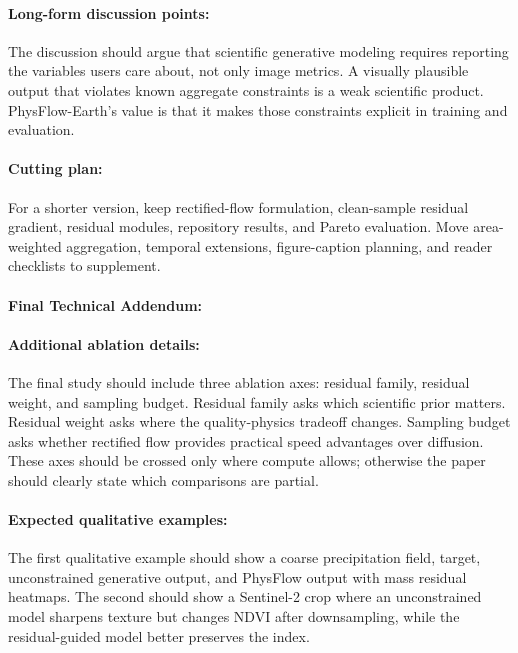 \documentclass{article}
\begin{document}
\paragraph{Long-form discussion points:}

The discussion should argue that scientific generative modeling requires reporting the variables users care about, not only image metrics. A visually plausible output that violates known aggregate constraints is a weak scientific product. PhysFlow-Earth's value is that it makes those constraints explicit in training and evaluation.

\paragraph{Cutting plan:}

For a shorter version, keep rectified-flow formulation, clean-sample residual gradient, residual modules, repository results, and Pareto evaluation. Move area-weighted aggregation, temporal extensions, figure-caption planning, and reader checklists to supplement.

\paragraph{Final Technical Addendum:}

\paragraph{Additional ablation details:}

The final study should include three ablation axes: residual family, residual weight, and sampling budget. Residual family asks which scientific prior matters. Residual weight asks where the quality-physics tradeoff changes. Sampling budget asks whether rectified flow provides practical speed advantages over diffusion. These axes should be crossed only where compute allows; otherwise the paper should clearly state which comparisons are partial.

\paragraph{Expected qualitative examples:}

The first qualitative example should show a coarse precipitation field, target, unconstrained generative output, and PhysFlow output with mass residual heatmaps. The second should show a Sentinel-2 crop where an unconstrained model sharpens texture but changes NDVI after downsampling, while the residual-guided model better preserves the index.
\end{document}
